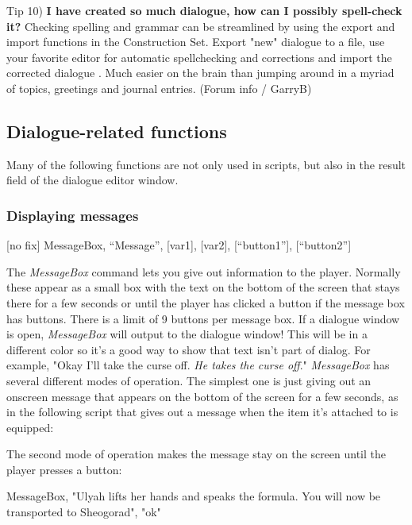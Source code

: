 Tip 10) \textbf{I have created so much dialogue, how can I possibly
spell-check it?} Checking spelling and grammar can be streamlined by
using the export and import functions in the Construction Set. Export
"new" dialogue to a file, use your favorite editor for automatic
spellchecking and corrections and import the corrected dialogue . Much
easier on the brain than jumping around in a myriad of topics, greetings
and journal entries. (Forum info / GarryB)

\hypertarget{dialogue-related-functions}{%
\subsection{Dialogue-related
functions}\label{dialogue-related-functions}}

Many of the following functions are not only used in scripts, but also
in the result field of the dialogue editor window.

\hypertarget{displaying-messages}{%
\subsubsection{Displaying messages}\label{displaying-messages}}

{[}no fix{]} MessageBox, ``Message'', {[}var1{]}, {[}var2{]},
{[}``button1''{]}, {[}``button2''{]}

The \emph{MessageBox} command lets you give out information to the
player. Normally these appear as a small box with the text on the bottom
of the screen that stays there for a few seconds or until the player has
clicked a button if the message box has buttons. There is a limit of 9
buttons per message box. If a dialogue window is open, \emph{MessageBox}
will output to the dialogue window! This will be in a different color so
it's a good way to show that text isn't part of dialog. For example,
"Okay I'll take the curse off. \emph{He takes the curse off}."
\emph{MessageBox} has several different modes of operation. The simplest
one is just giving out an onscreen message that appears on the bottom of
the screen for a few seconds, as in the following script that gives out
a message when the item it's attached to is equipped:



The second mode of operation makes the message stay on the screen until
the player presses a button:

MessageBox, "Ulyah lifts her hands and speaks the formula. You will now
be transported to Sheogorad", "ok"

